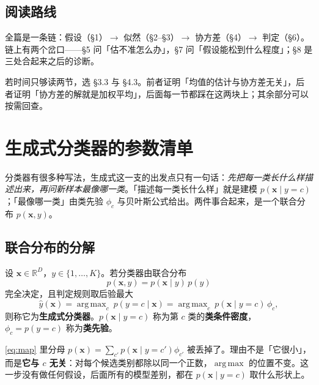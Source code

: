 \documentclass[11pt,a4paper,fontset=windows,zihao=-4]{ctexart}
\newcommand{\R}{\mathbb{R}}
\newcommand{\bx}{\mathbf{x}}
\DeclareMathOperator*{\argmax}{arg\,max}
\begin{document}
\subsection*{阅读路线}

全篇是一条链：假设（\S1）$\to$ 似然（\S2--\S3）$\to$ 协方差（\S4）$\to$ 判定（\S6）。链上有两个岔口——\S5 问「估不准怎么办」，\S7 问「假设能松到什么程度」；\S8 是三处合起来之后的诊断。

若时间只够读两节，选 \S3.3 与 \S4.3。前者证明「均值的估计与协方差无关」，后者证明「协方差的解就是加权平均」，后面每一节都踩在这两块上；其余部分可以按需回查。


\section{生成式分类器的参数清单}

分类器有很多种写法，生成式这一支的出发点只有一句话：\emph{先把每一类长什么样描述出来，再问新样本最像哪一类}。「描述每一类长什么样」就是建模 $p(\bx\mid y=c)$；「最像哪一类」由类先验 $\phi_c$ 与贝叶斯公式给出。两件事合起来，是一个联合分布 $p(\bx,y)$。

\subsection{联合分布的分解}

\begin{dfn}[生成式分类器]
设 $\bx\in\R^{D}$，$y\in\{1,\dots,K\}$。若分类器由联合分布
\begin{equation}
  p(\bx,y)=p(\bx\mid y)\,p(y)
  \label{eq:joint}
\end{equation}
完全决定，且判定规则取后验最大
\begin{equation}
  \hat y(\bx)=\argmax_{c}\ p(y=c\mid\bx)
  =\argmax_{c}\ p(\bx\mid y=c)\,\phi_c ,
  \label{eq:map}
\end{equation}
则称它为\textbf{生成式分类器}。$p(\bx\mid y=c)$ 称为第 $c$ 类的\textbf{类条件密度}，$\phi_c=p(y=c)$ 称为\textbf{类先验}。
\end{dfn}

\eqref{eq:map} 里分母 $p(\bx)=\sum_{c'}p(\bx\mid y=c')\phi_{c'}$ 被丢掉了。理由不是「它很小」，而是\textbf{它与 $c$ 无关}：对每个候选类别都除以同一个正数，$\argmax$ 的位置不变。这一步没有做任何假设，后面所有的模型差别，都在 $p(\bx\mid y=c)$ 取什么形状上。
\end{document}
